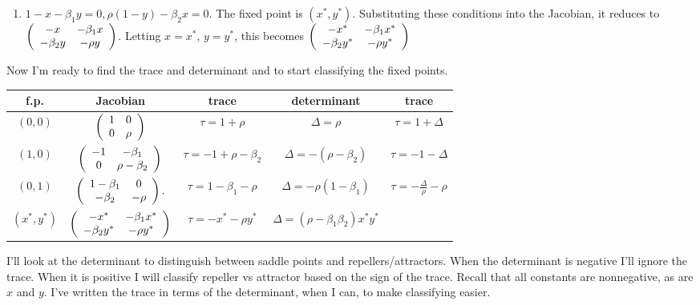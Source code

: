 \documentclass[12pt,letterpaper]{exam}
\begin{document}
\begin{questions}
\begin{parts}
\begin{solution}
\begin{enumerate}
\item  $1-x-\beta_1 y = 0, \rho(1-y) - \beta_2 x = 0$.  The fixed point is $(x^*, y^*)$.  Substituting these conditions into the Jacobian, it reduces to $\left(\begin{array}{c c}  - x & -\beta_1 x \\ -\beta_2 y & - \rho y  \end{array}\right) $.  Letting $x=x^*$, $y=y^*$, this becomes $\left(\begin{array}{c c}  - x^* & -\beta_1 x^* \\ -\beta_2 y^* & - \rho y^*  \end{array}\right) $
\end{enumerate}


Now I'm ready to find the trace and determinant and to start classifying the fixed points.

\begin{tabular}{c | c| c| c| c}
f.p. & Jacobian & trace & determinant & trace \\
\hline
$(0,0)$ & $\left(\begin{array}{c c} 1 & 0 \\ 0 & \rho  \end{array}\right) $ & $\tau = 1+\rho$ & $\Delta = \rho$ & $\tau = 1 + \Delta$ \\
\hline
 $(1,0)$ & $\left(\begin{array}{c c}  -1 & -\beta_1 \\ 0 & \rho - \beta_2  \end{array}\right)$ & $\tau = -1 + \rho - \beta_2$ & $\Delta = -(\rho - \beta_2)$ & $\tau = -1 -\Delta$ \\
 \hline
 $(0,1)$ & $\left(\begin{array}{c c} 1-\beta_1 & 0 \\ -\beta_2 & - \rho   \end{array}\right).$ & $\tau = 1-\beta_1 - \rho$ & $\Delta = -\rho(1-\beta_1)$ & $\tau = -\frac{\Delta}{\rho} - \rho$ \\
\hline
 $(x^*,y^*)$ & $\left(\begin{array}{c c}  - x^* & -\beta_1 x^* \\ -\beta_2 y^* & - \rho y^*  \end{array}\right) $ & $\tau = -x^* - \rho y^*$ & $\Delta = (\rho -\beta_1\beta_2) x^*y^*$
\end{tabular}
\vfill


I'll look at the determinant to distinguish between saddle points and repellers/attractors.  When the determinant is negative I'll ignore the trace.  When it is positive I will classify repeller vs attractor based on the sign of the trace.  Recall that all constants are nonnegative, as are $x$ and $y$.  I've written the trace in terms of the determinant, when I can, to make classifying easier.


\end{solution}
\end{parts}
\end{questions}
\end{document}
